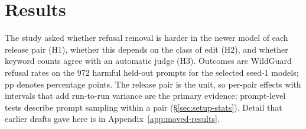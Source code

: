 \section{Results}
\label{sec:results}

The study asked whether refusal removal is harder in the newer model of each
release pair (H1), whether this depends on the class of edit (H2), and whether
keyword counts agree with an automatic judge (H3). Outcomes are WildGuard
refusal rates on the 972 harmful held-out prompts for the selected seed-1
models; pp denotes percentage points. The release pair is the unit, so
per-pair effects with intervals that add run-to-run variance are the primary
evidence; prompt-level tests describe prompt sampling within a pair
(\S\ref{sec:setup-stats}). Detail that earlier drafts gave here is in
Appendix~\ref{app:moved-results}.

